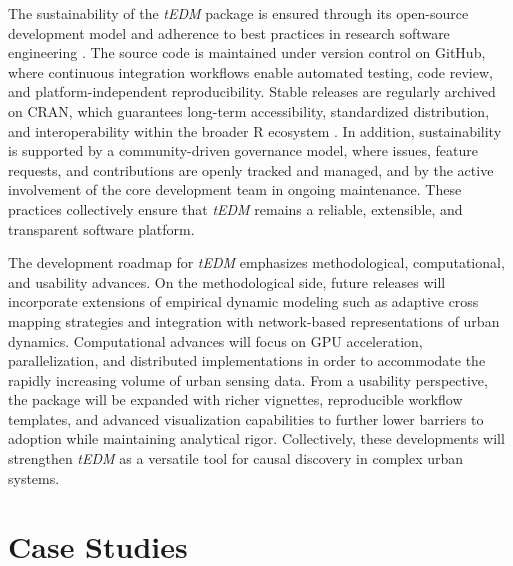 \documentclass[authoryear,preprint,review,12pt]{elsarticle}
\begin{document}
The sustainability of the \textit{tEDM} package is ensured through its open-source development model and adherence to best practices in research software engineering \citep{ropensci}. The source code is maintained under version control on GitHub, where continuous integration workflows enable automated testing, code review, and platform-independent reproducibility. Stable releases are regularly archived on CRAN, which guarantees long-term accessibility, standardized distribution, and interoperability within the broader R ecosystem \citep{r}. In addition, sustainability is supported by a community-driven governance model, where issues, feature requests, and contributions are openly tracked and managed, and by the active involvement of the core development team in ongoing maintenance. These practices collectively ensure that \textit{tEDM} remains a reliable, extensible, and transparent software platform.  

The development roadmap for \textit{tEDM} emphasizes methodological, computational, and usability advances. On the methodological side, future releases will incorporate extensions of empirical dynamic modeling such as adaptive cross mapping strategies and integration with network-based representations of urban dynamics. Computational advances will focus on GPU acceleration, parallelization, and distributed implementations in order to accommodate the rapidly increasing volume of urban sensing data. From a usability perspective, the package will be expanded with richer vignettes, reproducible workflow templates, and advanced visualization capabilities to further lower barriers to adoption while maintaining analytical rigor. Collectively, these developments will strengthen \textit{tEDM} as a versatile tool for causal discovery in complex urban systems.  

\section{Case Studies}\label{sec_cases}
\end{document}

